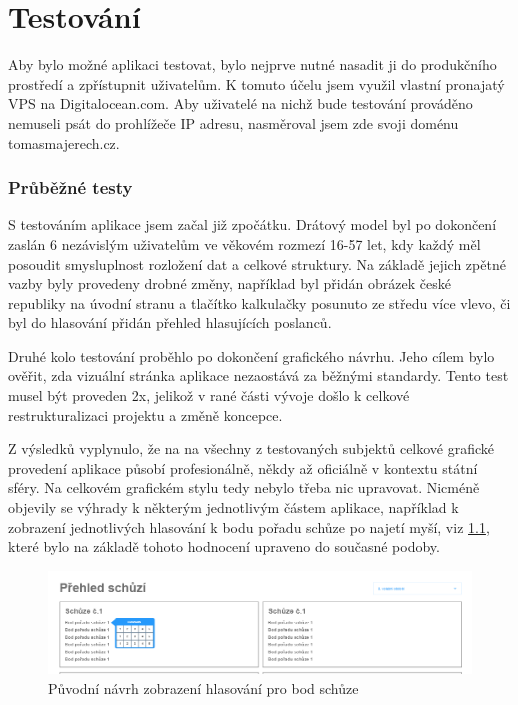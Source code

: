 \chapter{Testování}
\label{chap:testovani}
Aby bylo možné aplikaci testovat, bylo nejprve nutné nasadit ji do produkčního prostředí a zpřístupnit uživatelům. K tomuto účelu jsem využil vlastní pronajatý VPS na Digitalocean.com. Aby uživatelé na nichž bude testování prováděno nemuseli psát do prohlížeče IP adresu, nasměroval jsem zde svoji doménu tomasmajerech.cz. 

\subsection{Průběžné testy}
S testováním aplikace jsem začal již zpočátku. Drátový model byl po dokončení zaslán 6 nezávislým uživatelům ve věkovém rozmezí 16-57 let, kdy každý měl posoudit smysluplnost rozložení dat a celkové struktury. Na základě jejich zpětné vazby byly provedeny drobné změny, například byl přidán obrázek české republiky na úvodní stranu a tlačítko kalkulačky posunuto ze středu více vlevo, či byl do hlasování přidán přehled hlasujících poslanců.

\par Druhé kolo testování proběhlo po dokončení grafického návrhu. Jeho cílem bylo ověřit, zda vizuální stránka aplikace nezaostává za běžnými standardy. Tento test musel být proveden 2x, jelikož v rané části vývoje došlo k celkové restrukturalizaci projektu a změně koncepce.
\par Z výsledků vyplynulo, že na na všechny z testovaných subjektů celkové grafické provedení aplikace působí profesionálně, někdy až oficiálně v kontextu státní sféry. Na celkovém grafickém stylu tedy nebylo třeba nic upravovat. Nicméně objevily se výhrady k některým jednotlivým částem aplikace, například k zobrazení jednotlivých hlasování k bodu pořadu schůze po najetí myší, viz \ref{fig:wireframe-schuze-hover}, které bylo na základě tohoto hodnocení upraveno do současné podoby.

\begin{figure}
    \centering
    \includegraphics[width=1\textwidth]{obrazky-figures/wireframe-schuze-hover.png}
    \caption{Původní návrh zobrazení hlasování pro bod schůze}
    \label{fig:wireframe-schuze-hover}
\end{figure}


